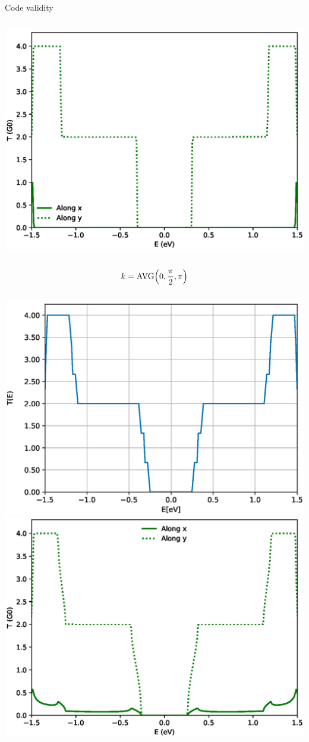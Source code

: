 \documentclass[hyperref={colorlinks=true,urlcolor=blue,linkcolor=.},aspectratio=1610,mathserif]{beamer}
\begin{document}
\begin{frame}{Code validity}
\begin{overprint}
\begin{columns}[t]
    \includegraphics[width=.87\textwidth]{Figures/txy_pi.eps}
\end{columns}
\centering
\begin{align*}
		k = \mathrm{AVG}\pqty{0,\frac{\pi}{2},\pi}
\end{align*}
\begin{columns}[t]
    \includegraphics[width=.9\textwidth]{Figures/NPGNormal_AVER.eps}
    \includegraphics[width=.87\textwidth]{Figures/txy_AVER.eps}
\end{columns}
\end{overprint}
\end{frame}
\end{document}
